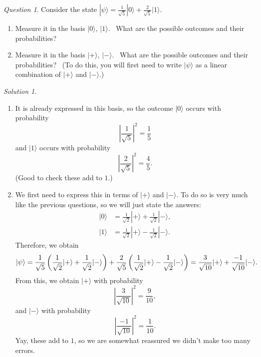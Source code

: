 \documentclass{article}
\theoremstyle{plain}
\theoremstyle{definition}
\theoremstyle{remark}
\newtheorem{question}[theorem]{Question}
\newtheorem*{solution}{Solution}
\numberwithin{theorem}{section}
\begin{document}
\begin{question} 
Consider the state $|\psi\rangle = \frac{1}{\sqrt{5}} |0\rangle + \frac{2}{\sqrt{5}}|1\rangle$.
\begin{enumerate}
\item Measure it in the basis $|0\rangle$, $|1\rangle$.  What are the possible outcomes and their probabilities?
\item Measure it in the basis $|+\rangle$, $|-\rangle$.  What are the possible outcomes and their probabilities?  (To do this, you will first need to write $|\psi\rangle$ as a linear combination of $|+\rangle$ and $|-\rangle$.)
\end{enumerate}
\end{question}


\begin{solution}
\begin{enumerate}
	\item It is already expressed in this basis, so the outcome $|0\rangle$ occurs with probability
\[
	\left| \frac{1}{\sqrt{5}} \right|^2 = \frac{1}{5}
\]
and $|1 \rangle$ occurs with probability
\[
	\left| \frac{2}{\sqrt{5}} \right|^2 = \frac{4}{5}.
\]
(Good to check these add to $1$.)
\item We first need to express this in terms of $|+\rangle$ and $|-\rangle$.  To do so is very much like the previous questions, so we will just state the answers:
	\begin{align*}
		|0\rangle &= \frac{1}{\sqrt{2}} |+ \rangle + \frac{1}{\sqrt{2}} |- \rangle,  \\
		|1\rangle &= \frac{1}{\sqrt{2}} |+ \rangle - \frac{1}{\sqrt{2}} |- \rangle.
	\end{align*}
	Therefore, we obtain
	\[
		| \psi \rangle = \frac{1}{\sqrt{5}} \left(
		 \frac{1}{\sqrt{2}} |+ \rangle + \frac{1}{\sqrt{2}} |- \rangle  \\
			\right)
			+ \frac{2}{\sqrt{5}} \left(
		 \frac{1}{\sqrt{2}} |+ \rangle - \frac{1}{\sqrt{2}} |- \rangle
			\right)
			=
			\frac{3}{\sqrt{10}} | + \rangle + \frac{-1}{\sqrt{10}} |-\rangle.
		\]
		From this, we obtain $| + \rangle$ with probability 
		\[
			\left| \frac{3}{\sqrt{10}} \right|^2 = \frac{9}{10},
		\]
		and $| - \rangle$ with probability
		\[
			\left| \frac{-1}{\sqrt{10}} \right|^2 = \frac{1}{10}.
		\]
		Yay, these add to $1$, so we are somewhat reassured we didn't make too many errors.


\end{enumerate}
\end{solution}
\end{document}
